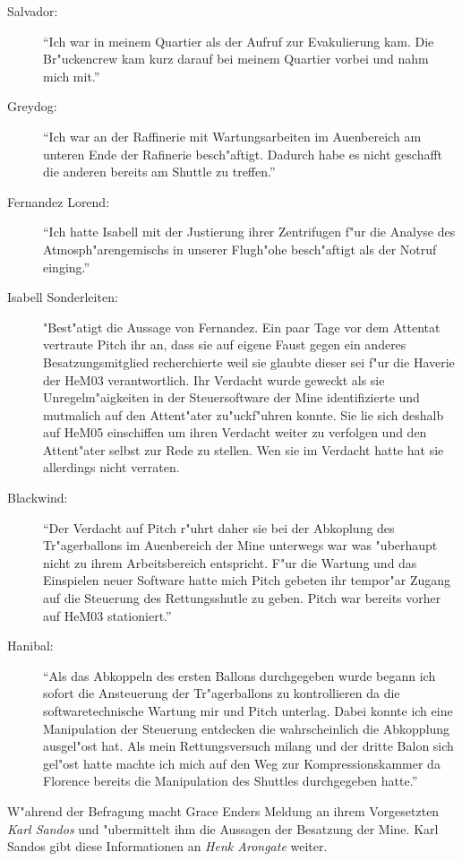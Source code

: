 \begin{description}
	\item[Salvador:] "`Ich war in meinem Quartier als der Aufruf zur Evakulierung kam. Die Br"uckencrew kam kurz darauf bei meinem Quartier vorbei und nahm mich mit."' 
	\item[Greydog:] "`Ich war an der Raffinerie mit Wartungsarbeiten im Au\3enbereich am unteren Ende der Rafinerie besch"aftigt. Dadurch habe es nicht geschafft die anderen bereits am Shuttle zu treffen."'
	\item[Fernandez Lorend:] "`Ich hatte Isabell mit der Justierung ihrer Zentrifugen f"ur die Analyse des Atmosph"arengemischs in unserer Flugh"ohe besch"aftigt als der Notruf einging."'
	\item[Isabell Sonderleiten:] "Best"atigt die Aussage von Fernandez. Ein paar Tage vor dem Attentat vertraute Pitch ihr an, dass sie auf eigene Faust gegen ein anderes Besatzungsmitglied recherchierte weil sie glaubte dieser sei f"ur die Haverie der HeM03 verantwortlich. Ihr Verdacht wurde geweckt als sie Unregelm"a\3igkeiten in der Steuersoftware der Mine identifizierte und mutma\3lich auf den Attent"ater zu"uckf"uhren konnte. Sie lie\3 sich deshalb auf HeM05 einschiffen um ihren Verdacht weiter zu verfolgen und den Attent"ater selbst zur Rede zu stellen. Wen sie im Verdacht hatte hat sie allerdings nicht verraten. 
	\item[Blackwind:] "`Der Verdacht auf Pitch r"uhrt daher sie bei der Abkoplung des Tr"agerballons im Au\3enbereich der Mine unterwegs war was "uberhaupt nicht zu ihrem Arbeitsbereich entspricht. F"ur die Wartung und das Einspielen neuer Software hatte mich Pitch gebeten ihr tempor"ar Zugang auf die Steuerung des Rettungsshutle zu geben. Pitch war bereits vorher auf HeM03 stationiert."'
	\item[Hanibal:] "`Als das Abkoppeln des ersten Ballons durchgegeben wurde begann ich sofort die Ansteuerung der Tr"agerballons zu kontrollieren da die softwaretechnische Wartung mir und Pitch unterlag. Dabei konnte ich eine Manipulation der Steuerung entdecken die wahrscheinlich die Abkopplung ausgel"ost hat. Als mein Rettungsversuch mi\3lang und der dritte Balon sich gel"ost hatte machte ich mich auf den Weg zur Kompressionskammer da Florence bereits die Manipulation des Shuttles durchgegeben hatte."'
\end{description}

W"ahrend der Befragung macht Grace Enders Meldung an ihrem Vorgesetzten \emph{Karl Sandos} und "ubermittelt ihm die Aussagen der Besatzung der Mine. Karl Sandos gibt diese Informationen an \emph{Henk Arongate} weiter.

